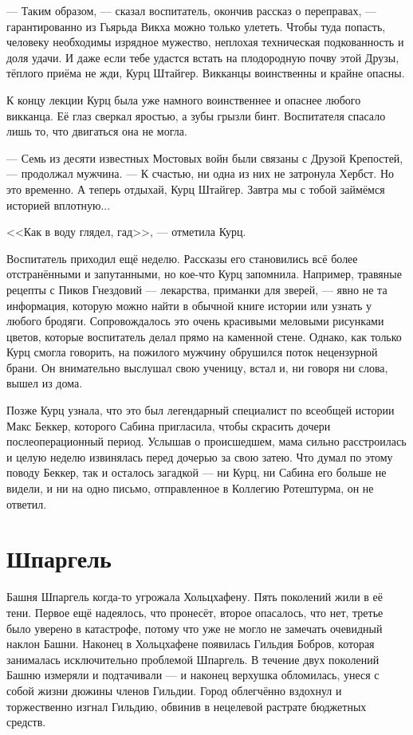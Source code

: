 --- Таким образом, --- сказал воспитатель, окончив рассказ о переправах, --- гарантированно из Гьярьда Викха можно только улететь.
Чтобы туда попасть, человеку необходимы изрядное мужество, неплохая техническая подкованность и доля удачи.
И даже если тебе удастся встать на плодородную почву этой Друзы, тёплого приёма не жди, Курц Штайгер.
Викканцы воинственны и крайне опасны.

К концу лекции Курц была уже намного воинственнее и опаснее любого викканца.
Её глаз сверкал яростью, а зубы грызли бинт.
Воспитателя спасало лишь то, что двигаться она не могла.

--- Семь из десяти известных Мостовых войн были связаны с Друзой Крепостей, --- продолжал мужчина.
--- К счастью, ни одна из них не затронула Хербст.
Но это временно.
А теперь отдыхай, Курц Штайгер.
Завтра мы с тобой займёмся историей вплотную...

<<Как в воду глядел, гад>>, --- отметила Курц.

Воспитатель приходил ещё неделю.
Рассказы его становились всё более отстранёнными и запутанными, но кое-что Курц запомнила.
Например, травяные рецепты с Пиков Гнездовий --- лекарства, приманки для зверей, --- явно не та информация, которую можно найти в обычной книге истории или узнать у любого бродяги.
Сопровождалось это очень красивыми меловыми рисунками цветов, которые воспитатель делал прямо на каменной стене.
Однако, как только Курц смогла говорить, на пожилого мужчину обрушился поток нецензурной брани.
Он внимательно выслушал свою ученицу, встал и, ни говоря ни слова, вышел из дома.

Позже Курц узнала, что это был легендарный специалист по всеобщей истории Макс Беккер, которого Сабина пригласила, чтобы скрасить дочери послеоперационный период.
Услышав о происшедшем, мама сильно расстроилась и целую неделю извинялась перед дочерью за свою затею.
Что думал по этому поводу Беккер, так и осталось загадкой --- ни Курц, ни Сабина его больше не видели, и ни на одно письмо, отправленное в Коллегию Ротештурма, он не ответил.

\section{Шпаргель}

Башня Шпаргель когда-то угрожала Хольцхафену.
Пять поколений жили в её тени.
Первое ещё надеялось, что пронесёт, второе опасалось, что нет, третье было уверено в катастрофе, потому что уже не могло не замечать очевидный наклон Башни.
Наконец в Хольцхафене появилась Гильдия Бобров, которая занималась исключительно проблемой Шпаргель.
В течение двух поколений Башню измеряли и подтачивали --- и наконец верхушка обломилась, унеся с собой жизни дюжины членов Гильдии.
Город облегчённо вздохнул и торжественно изгнал Гильдию, обвинив в нецелевой растрате бюджетных средств.

